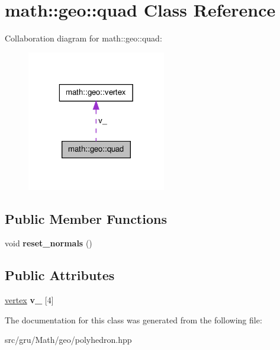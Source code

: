 \hypertarget{classmath_1_1geo_1_1quad}{\section{math\-:\-:geo\-:\-:quad \-Class \-Reference}
\label{classmath_1_1geo_1_1quad}
}


\-Collaboration diagram for math\-:\-:geo\-:\-:quad\-:\nopagebreak
\begin{figure}[H]
\begin{center}
\leavevmode
\includegraphics[width=172pt]{classmath_1_1geo_1_1quad__coll__graph}
\end{center}
\end{figure}
\subsection*{\-Public \-Member \-Functions}
\begin{DoxyCompactItemize}
\item 
\hypertarget{classmath_1_1geo_1_1quad_a61f7422d3d82b7acab0aabd71b68fccf}{void {\bfseries reset\-\_\-normals} ()}\label{classmath_1_1geo_1_1quad_a61f7422d3d82b7acab0aabd71b68fccf}

\end{DoxyCompactItemize}
\subsection*{\-Public \-Attributes}
\begin{DoxyCompactItemize}
\item 
\hypertarget{classmath_1_1geo_1_1quad_a6625bbd8467b8a853aae1f4f2a2362ec}{\hyperlink{classmath_1_1geo_1_1vertex}{vertex} {\bfseries v\-\_\-} \mbox{[}4\mbox{]}}\label{classmath_1_1geo_1_1quad_a6625bbd8467b8a853aae1f4f2a2362ec}

\end{DoxyCompactItemize}


\-The documentation for this class was generated from the following file\-:\begin{DoxyCompactItemize}
\item 
src/gru/\-Math/geo/polyhedron.\-hpp\end{DoxyCompactItemize}
